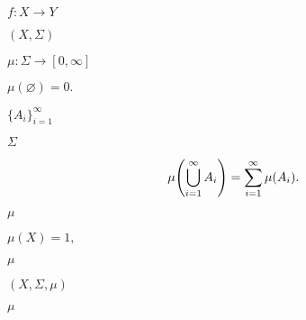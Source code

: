 \documentclass[10pt]{book}
\begin{document}
\begin{mdSnippets}
\begin{mdInlineSnippet}[2385fde6b300ad088e0c2711c9da8a74]%
$f: X \to Y$\end{mdInlineSnippet}%
\begin{mdInlineSnippet}[4f63e1397362dfddde7f9605fc68fb64]%
$(X, \Sigma)$\end{mdInlineSnippet}%
\begin{mdInlineSnippet}%
$\mu: \Sigma \to [0, \infty]$\end{mdInlineSnippet}%
\begin{mdInlineSnippet}%
$\mu(\varnothing) = 0.$\end{mdInlineSnippet}%
\begin{mdInlineSnippet}[285e38d14735127a14e606e4b16c8dab]%
$\{A_i\}_{i=1}^\infty$\end{mdInlineSnippet}%
\begin{mdInlineSnippet}[025b3f94d79319f2067156076bf05243]%
$\Sigma$\end{mdInlineSnippet}%
\begin{mdDisplaySnippet}[8f71eb3be455c60b59d830519c7a0b97]%
\[%
\mu\qty(\bigcup_{i=1}^\infty A_i) = \sum_{i=1}^\infty \mu(A_i).
\]%
\end{mdDisplaySnippet}%
\begin{mdInlineSnippet}%
$\mu$\end{mdInlineSnippet}%
\begin{mdInlineSnippet}%
$\mu(X) = 1,$\end{mdInlineSnippet}%
\begin{mdInlineSnippet}%
$\mu$\end{mdInlineSnippet}%
\begin{mdInlineSnippet}[4429e97c6c5c5e3f564fdfd53852bb3b]%
$(X, \Sigma, \mu)$\end{mdInlineSnippet}%
\begin{mdInlineSnippet}%
$\mu$\end{mdInlineSnippet}%
\begin{mdInlineSnippet}[02129bb861061d1a052c592e2dc6b383]%

\end{mdInlineSnippet}
\end{mdSnippets}
\end{document}
